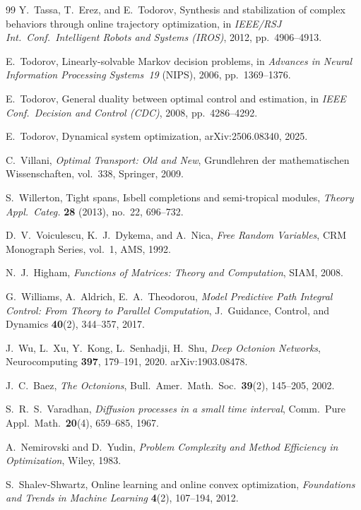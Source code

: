 \begin{thebibliography}{99}
Y.~Tassa, T.~Erez, and E.~Todorov,
Synthesis and stabilization of complex behaviors through online
trajectory optimization,
in \emph{IEEE/RSJ Int.\ Conf.\ Intelligent Robots and Systems (IROS)},
2012, pp.~4906--4913.

E.~Todorov,
Linearly-solvable Markov decision problems,
in \emph{Advances in Neural Information Processing Systems~19} (NIPS),
2006, pp.~1369--1376.

E.~Todorov,
General duality between optimal control and estimation,
in \emph{IEEE Conf.\ Decision and Control (CDC)}, 2008, pp.~4286--4292.

E.~Todorov,
Dynamical system optimization,
arXiv:2506.08340, 2025.

C.~Villani,
\emph{Optimal Transport: Old and New},
Grundlehren der mathematischen Wissenschaften, vol.~338, Springer, 2009.

S.~Willerton,
Tight spans, Isbell completions and semi-tropical modules,
\emph{Theory Appl.\ Categ.} \textbf{28} (2013), no.~22, 696--732.

D.~V.~Voiculescu, K.~J.~Dykema, and A.~Nica,
\emph{Free Random Variables},
CRM Monograph Series, vol.~1, AMS, 1992.

N.~J.~Higham,
\emph{Functions of Matrices: Theory and Computation},
SIAM, 2008.

G.~Williams, A.~Aldrich, E.~A.~Theodorou,
\emph{Model Predictive Path Integral Control: From Theory to Parallel
Computation},
J.~Guidance, Control, and Dynamics \textbf{40}(2), 344--357, 2017.

J.~Wu, L.~Xu, Y.~Kong, L.~Senhadji, H.~Shu,
\emph{Deep Octonion Networks},
Neurocomputing \textbf{397}, 179--191, 2020.
arXiv:1903.08478.

J.~C.~Baez,
\emph{The Octonions},
Bull.\ Amer.\ Math.\ Soc.\ \textbf{39}(2), 145--205, 2002.

S.~R.~S.~Varadhan,
\emph{Diffusion processes in a small time interval},
Comm.\ Pure Appl.\ Math.\ \textbf{20}(4), 659--685, 1967.

A.~Nemirovski and D.~Yudin,
\emph{Problem Complexity and Method Efficiency in Optimization},
Wiley, 1983.

S.~Shalev-Shwartz,
Online learning and online convex optimization,
\emph{Foundations and Trends in Machine Learning} \textbf{4}(2), 107--194, 2012.


\end{thebibliography}
